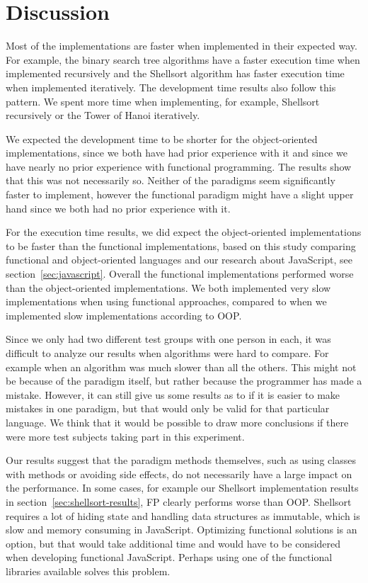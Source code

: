 \documentclass {article}
\begin{document}
\section{Discussion}
Most of the implementations are faster when implemented in their expected way. For example, the binary search tree algorithms have a faster execution time when implemented recursively and the Shellsort algorithm has faster execution time when implemented iteratively. The development time results also follow this pattern. We spent more time when implementing, for example, Shellsort recursively or the Tower of Hanoi iteratively. 

We expected the development time to be shorter for the object-oriented implementations, since we both have had prior experience with it and since we have nearly no prior experience with functional programming. The results show that this was not necessarily so. Neither of the paradigms seem significantly faster to implement, however the functional paradigm might have a slight upper hand since we both had no prior experience with it. 

For the execution time results, we did expect the object-oriented implementations to be faster than the functional implementations, based on this study comparing functional and object-oriented languages \cite{hasmadole} and our research about JavaScript, see section~\ref{sec:javascript}. Overall the functional implementations performed worse than the object-oriented implementations. We both implemented very slow implementations when using functional approaches, compared to when we implemented slow implementations according to OOP.

Since we only had two different test groups with one person in each, it was difficult to analyze our results when algorithms were hard to compare. For example when an algorithm was much slower than all the others. This might not be because of the paradigm itself, but rather because the programmer has made a mistake. However, it can still give us some results as to if it is easier to make mistakes in one paradigm, but that would only be valid for that particular language. We think that it would be possible to draw more conclusions if there were more test subjects taking part in this experiment.

Our results suggest that the paradigm methods themselves, such as using classes with methods or avoiding side effects, do not necessarily have a large impact on the performance. In some cases, for example our Shellsort implementation results in section~\ref{sec:shellsort-results}, FP clearly performs worse than OOP. Shellsort requires a lot of hiding state and handling data structures as immutable, which is slow and memory consuming in JavaScript. Optimizing functional solutions is an option, but that would take additional time and would have to be considered when developing functional JavaScript. Perhaps using one of the functional libraries available solves this problem.
\end{document}
